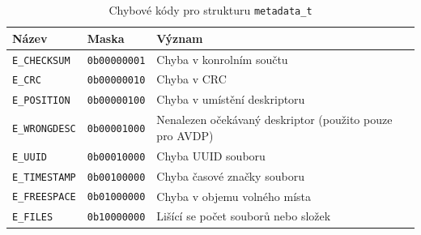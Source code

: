 \begin{table}
    \begin{tabular}{ | l | l | l | }
        \hline
        Název & Maska & Význam \\ \hline\hline
        \texttt{E\_CHECKSUM} & \texttt{0b00000001} & Chyba v konrolním součtu \\ \hline
        \texttt{E\_CRC}      & \texttt{0b00000010} & Chyba v CRC \\ \hline
        \texttt{E\_POSITION} & \texttt{0b00000100} & Chyba v umístění deskriptoru\\ \hline
        \texttt{E\_WRONGDESC}& \texttt{0b00001000} & Nenalezen očekávaný deskriptor (použito pouze pro AVDP)\\ \hline
        \texttt{E\_UUID}     & \texttt{0b00010000} & Chyba UUID souboru \\ \hline
        \texttt{E\_TIMESTAMP}& \texttt{0b00100000} & Chyba časové značky souboru\\ \hline
        \texttt{E\_FREESPACE}& \texttt{0b01000000} & Chyba v objemu volného místa\\ \hline
        \texttt{E\_FILES}    & \texttt{0b10000000} & Lišící se počet souborů nebo složek\\ \hline
    \end{tabular}
    \caption{Chybové kódy pro strukturu \texttt{metadata\_t}\label{tab:E-codes}}
\end{table}

